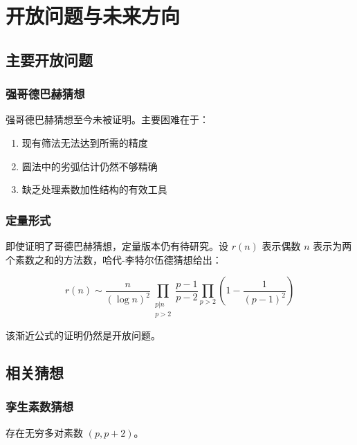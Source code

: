\section{开放问题与未来方向}\label{sec:open_problems}

\subsection{主要开放问题}

\subsubsection{强哥德巴赫猜想}

强哥德巴赫猜想至今未被证明。主要困难在于：

\begin{enumerate}
    \item 现有筛法无法达到所需的精度
    \item 圆法中的劣弧估计仍然不够精确
    \item 缺乏处理素数加性结构的有效工具
\end{enumerate}

\subsubsection{定量形式}

即使证明了哥德巴赫猜想，定量版本仍有待研究。设 $r(n)$ 表示偶数 $n$ 表示为两个素数之和的方法数，哈代-李特尔伍德猜想给出\cite{hardy1923some}：

\begin{equation}
    r(n) \sim \frac{n}{(\log n)^2} \prod_{\substack{p|n \\ p>2}} \frac{p-1}{p-2} \prod_{p>2} \left(1 - \frac{1}{(p-1)^2}\right)
\end{equation}

该渐近公式的证明仍然是开放问题。

\subsection{相关猜想}

\subsubsection{孪生素数猜想}

\begin{conjecture}[孪生素数猜想]
    存在无穷多对素数 $(p, p+2)$。
\end{conjecture}

